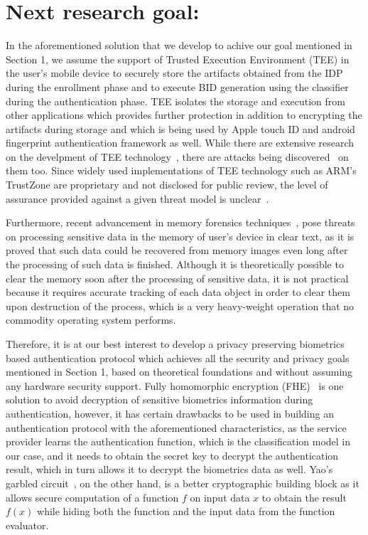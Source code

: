 \documentclass[10pt]{article}
\begin{document}
\section{Next research goal:}
In the aforementioned solution that we develop to achive our goal mentioned in Section 1, we assume the support of Trusted Execution Environment 
(TEE) in the user's mobile device to securely store the artifacts obtained from the IDP during the enrollment phase and to execute BID generation 
using the classifier during the authentication phase. TEE isolates the storage and execution from other applications which provides further 
protection in addition to encrypting the artifacts during storage and which is being used by Apple touch ID and android fingerprint authentication 
framework as well.
While there are extensive research on the develpment of TEE technology~\cite{tee}, there are attacks being discovered~\cite{blackhat} on them too. 
Since widely used implementations of TEE technology such as ARM's TrustZone are proprietary and not disclosed for public review, the level of 
assurance provided against a given threat model is unclear~\cite{armtrustzone}. 

Furthermore, recent advancement in memory forensics techniques~\cite{dimsum}, pose threats on processing sensitive data in the memory of user's 
device in clear text, as it is proved that such data could be recovered from memory images even long after the processing of such data is finished. 
Although it is theoretically possible to clear the memory soon after the processing of sensitive data, it is not practical because it requires 
accurate tracking of each data object in order to clear them upon destruction of the process, which is a very heavy-weight operation 
that no commodity operating system performs.

Therefore, it is at our best interest to develop a privacy preserving biometrics based authentication protocol which achieves all the security and 
privacy goals mentioned in Section 1, based on theoretical foundations and without assuming any hardware security support. Fully homomorphic 
encryption (FHE)~\cite{fhe} is one solution to avoid decryption of sensitive biometrics information during authentication, however, it has certain 
drawbacks to be used in building an authentication protocol with the aforementioned characteristics, as the service provider learns the 
authentication function, which is the classification model in our case, and it needs to obtain the secret key to decrypt the authentication result, 
which in turn allows it to decrypt the biometrics data as well. Yao's garbled circuit~\cite{yaogc}, on the other hand, is a better cryptographic 
building block as it allows secure computation of a function $f$ on input data $x$ to obtain the result $f(x)$ while hiding both the function and the 
input data from the function evaluator.
\end{document}
